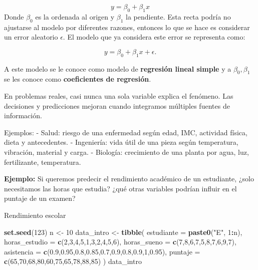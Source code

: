 \documentclass[
]{book}
\newenvironment{Shaded}{\begin{snugshade}}{\end{snugshade}}
\newcommand{\AttributeTok}[1]{\textcolor[rgb]{0.13,0.29,0.53}{#1}}
\newcommand{\DecValTok}[1]{\textcolor[rgb]{0.00,0.00,0.81}{#1}}
\newcommand{\FloatTok}[1]{\textcolor[rgb]{0.00,0.00,0.81}{#1}}
\newcommand{\FunctionTok}[1]{\textcolor[rgb]{0.13,0.29,0.53}{\textbf{#1}}}
\newcommand{\NormalTok}[1]{#1}
\newcommand{\OtherTok}[1]{\textcolor[rgb]{0.56,0.35,0.01}{#1}}
\newcommand{\SpecialCharTok}[1]{\textcolor[rgb]{0.81,0.36,0.00}{\textbf{#1}}}
\newcommand{\StringTok}[1]{\textcolor[rgb]{0.31,0.60,0.02}{#1}}
\begin{document}
\[y=\beta_0+\beta_1x\]
Donde \(\beta_0\) es la ordenada al origen y \(\beta_1\) la pendiente. Esta recta podría no ajustarse al modelo por diferentes razones, entonces lo que se hace es considerar un error aleatorio \(\epsilon\). El modelo que ya considera este error se representa como:

\[y=\beta_0+\beta_1x+\epsilon.\]

A este modelo se le conoce como modelo de \textbf{regresión lineal simple} y a \(\beta_0,\beta_1\) se les conoce como \textbf{coeficientes de regresión}.

En problemas reales, casi nunca una sola variable explica el fenómeno. Las decisiones y predicciones mejoran cuando integramos múltiples fuentes de información.

Ejemplos:
- Salud: riesgo de una enfermedad según edad, IMC, actividad física, dieta y antecedentes.
- Ingeniería: vida útil de una pieza según temperatura, vibración, material y carga.
- Biología: crecimiento de una planta por agua, luz, fertilizante, temperatura.

\textbf{Ejemplo:} Si queremos predecir el rendimiento académico de un estudiante, ¿solo necesitamos las horas que estudia? ¿qué otras variables podrían influir en el puntaje de un examen?

Rendimiento escolar

\begin{Shaded}
\begin{Highlighting}[]
\FunctionTok{set.seed}\NormalTok{(}\DecValTok{123}\NormalTok{)}
\NormalTok{n }\OtherTok{\textless{}{-}} \DecValTok{10}
\NormalTok{data\_intro }\OtherTok{\textless{}{-}} \FunctionTok{tibble}\NormalTok{(}
  \AttributeTok{estudiante =} \FunctionTok{paste0}\NormalTok{(}\StringTok{"E"}\NormalTok{, }\DecValTok{1}\SpecialCharTok{:}\NormalTok{n),}
  \AttributeTok{horas\_estudio =} \FunctionTok{c}\NormalTok{(}\DecValTok{2}\NormalTok{,}\DecValTok{3}\NormalTok{,}\DecValTok{4}\NormalTok{,}\DecValTok{5}\NormalTok{,}\DecValTok{1}\NormalTok{,}\DecValTok{3}\NormalTok{,}\DecValTok{2}\NormalTok{,}\DecValTok{4}\NormalTok{,}\DecValTok{5}\NormalTok{,}\DecValTok{6}\NormalTok{),}
  \AttributeTok{horas\_sueno  =} \FunctionTok{c}\NormalTok{(}\DecValTok{7}\NormalTok{,}\DecValTok{8}\NormalTok{,}\DecValTok{6}\NormalTok{,}\DecValTok{7}\NormalTok{,}\DecValTok{5}\NormalTok{,}\DecValTok{8}\NormalTok{,}\DecValTok{7}\NormalTok{,}\DecValTok{6}\NormalTok{,}\DecValTok{9}\NormalTok{,}\DecValTok{7}\NormalTok{),}
  \AttributeTok{asistencia   =} \FunctionTok{c}\NormalTok{(}\FloatTok{0.9}\NormalTok{,}\FloatTok{0.95}\NormalTok{,}\FloatTok{0.8}\NormalTok{,}\FloatTok{0.85}\NormalTok{,}\FloatTok{0.7}\NormalTok{,}\FloatTok{0.9}\NormalTok{,}\FloatTok{0.8}\NormalTok{,}\FloatTok{0.9}\NormalTok{,}\DecValTok{1}\NormalTok{,}\FloatTok{0.95}\NormalTok{),}
  \AttributeTok{puntaje      =} \FunctionTok{c}\NormalTok{(}\DecValTok{65}\NormalTok{,}\DecValTok{70}\NormalTok{,}\DecValTok{68}\NormalTok{,}\DecValTok{80}\NormalTok{,}\DecValTok{60}\NormalTok{,}\DecValTok{75}\NormalTok{,}\DecValTok{65}\NormalTok{,}\DecValTok{78}\NormalTok{,}\DecValTok{88}\NormalTok{,}\DecValTok{85}\NormalTok{)}
\NormalTok{)}
\NormalTok{data\_intro}
\end{Highlighting}
\end{Shaded}
\end{document}
